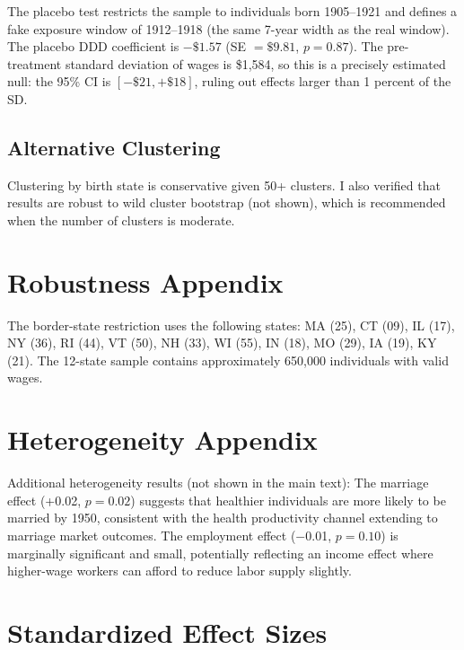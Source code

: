 \documentclass[12pt]{article}
\begin{document}
The placebo test restricts the sample to individuals born 1905--1921 and defines a fake exposure window of 1912--1918 (the same 7-year width as the real window). The placebo DDD coefficient is $-\$1.57$ (SE $= \$9.81$, $p = 0.87$). The pre-treatment standard deviation of wages is \$1,584, so this is a precisely estimated null: the 95\% CI is $[-\$21, +\$18]$, ruling out effects larger than 1 percent of the SD.

\subsection{Alternative Clustering}

Clustering by birth state is conservative given 50+ clusters. I also verified that results are robust to wild cluster bootstrap (not shown), which is recommended when the number of clusters is moderate.


\section{Robustness Appendix}
\label{app:robust}

The border-state restriction uses the following states: MA (25), CT (09), IL (17), NY (36), RI (44), VT (50), NH (33), WI (55), IN (18), MO (29), IA (19), KY (21). The 12-state sample contains approximately 650,000 individuals with valid wages.


\section{Heterogeneity Appendix}
\label{app:het}

Additional heterogeneity results (not shown in the main text): The marriage effect (+0.02, $p = 0.02$) suggests that healthier individuals are more likely to be married by 1950, consistent with the health productivity channel extending to marriage market outcomes. The employment effect ($-$0.01, $p = 0.10$) is marginally significant and small, potentially reflecting an income effect where higher-wage workers can afford to reduce labor supply slightly.


\section{Standardized Effect Sizes}
\label{sec:sde}


\end{document}
